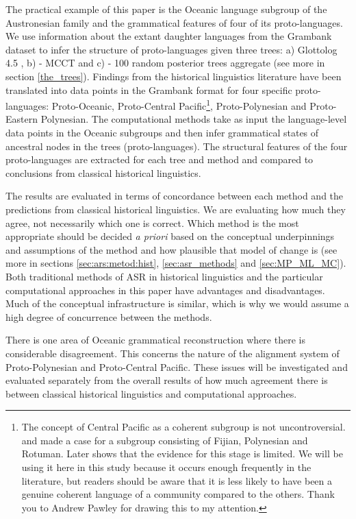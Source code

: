 \documentclass[12pt,letterpaper]{article}
\begin{document}
The practical example of this paper is the Oceanic language subgroup of the Austronesian family and the grammatical features of four of its proto-languages. We use information about the extant daughter languages from the Grambank dataset \citep{grambank_release} to infer the structure of proto-languages given three trees: a) Glottolog 4.5 \citep{glottolog4_5}, b)\citet{grayetal_2009} - MCCT and c) \citet{grayetal_2009} - 100 random posterior trees aggregate (see more in section \ref{the_trees}). Findings from the historical linguistics literature have been translated into data points in the Grambank format for four specific proto-languages: Proto-Oceanic, Proto-Central Pacific\footnote{The concept of Central Pacific as a coherent subgroup is not uncontroversial. \citet{grace1958position} and \citet{pawley1972internal} made a case for a subgroup consisting of Fijian, Polynesian and Rotuman. Later \citet{geraghty1996} shows that the evidence for this stage is limited. We will be using it here in this study because it occurs enough frequently in the literature, but readers should be aware that it is less likely to have been a genuine coherent language of a community compared to the others. Thank you to Andrew Pawley for drawing this to my attention.}, Proto-Polynesian and Proto-Eastern Polynesian. The computational methods take as input the language-level data points in the Oceanic subgroups and then infer grammatical states of ancestral nodes in the trees (proto-languages). The structural features of the four proto-languages are extracted for each tree and method and compared to conclusions from classical historical linguistics. 

The results are evaluated in terms of concordance between each method and the predictions from classical historical linguistics. We are evaluating how much they agree, not necessarily which one is correct. Which method is the most appropriate should be decided \emph{a priori} based on the conceptual underpinnings and assumptions of the method and how plausible that model of change is (see more in sections \ref{sec:ars:metod:hist}, \ref{sec:asr_methods} and \ref{sec:MP_ML_MC}). Both traditional methods of ASR in historical linguistics and the particular computational approaches in this paper have advantages and disadvantages. Much of the conceptual infrastructure is similar, which is why we would assume a high degree of concurrence between the methods. 

There is one area of Oceanic grammatical reconstruction where there is considerable disagreement. This concerns the nature of the alignment system of Proto-Polynesian and Proto-Central Pacific. These issues will be investigated and evaluated separately from the overall results of how much agreement there is between classical historical linguistics and computational approaches.
\end{document}
